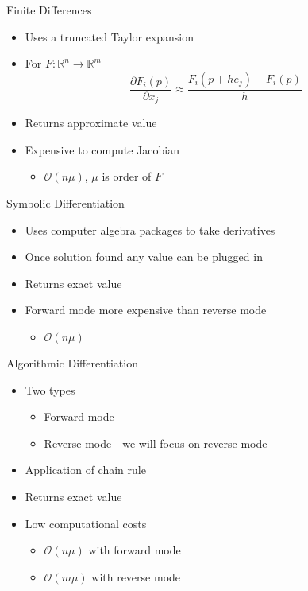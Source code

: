 \documentclass{beamer}
\begin{document}
\begin{frame}{Finite Differences}
    \begin{itemize}
        \item Uses a truncated Taylor expansion
        \item For $F: \mathbb{R}^n \longrightarrow \mathbb{R}^m$
            \begin{equation*}
            \frac{\partial F_i (p)}{\partial x_j} \approx \frac{F_i(p+he_j) - F_i(p)}{h}
            \end{equation*}
        \item Returns \alert{approximate} value
        \item Expensive to compute Jacobian
            \begin{itemize}
                \item $\mathcal{O}(n \mu)$, $\mu$ is order of $F$
            \end{itemize}
    \end{itemize}  
\end{frame}

\begin{frame}{Symbolic Differentiation}
    \begin{itemize}
        \item Uses computer algebra packages to take derivatives
        \item Once solution found any value can be plugged in
        \item Returns \alert{exact} value
        \item Forward mode more expensive than reverse mode
            \begin{itemize}
                \item $\mathcal{O}(n \mu)$
            \end{itemize}
    \end{itemize}
\end{frame}

\begin{frame}{Algorithmic Differentiation}
    \begin{itemize}
        \item Two types
            \begin{itemize}
                \item Forward mode
                \item Reverse mode - we will focus on reverse mode
            \end{itemize}
        \item Application of chain rule
        \item Returns \alert{exact} value
        \item Low computational costs
            \begin{itemize}
                \item $\mathcal{O}(n \mu)$ with forward mode
                \item $\mathcal{O}(m \mu)$ with reverse mode
            \end{itemize}
    \end{itemize}
\end{frame}
\end{document}
